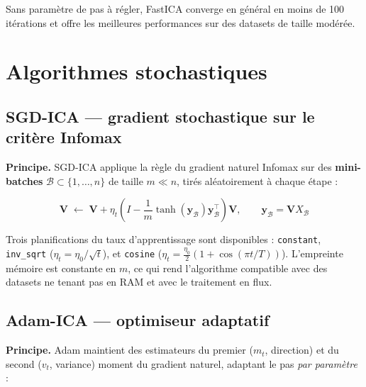 \documentclass[12pt, a4paper]{article}
\newcommand{\V}{\mathbf{V}}        %
\newcommand{\y}{\mathbf{y}}        %
\begin{document}
Sans paramètre de pas à régler, FastICA converge en général en moins de 100 itérations
et offre les meilleures performances sur des datasets de taille modérée.

\section{Algorithmes stochastiques}

\subsection{SGD-ICA — gradient stochastique sur le critère Infomax}

\textbf{Principe.}
SGD-ICA applique la règle du gradient naturel Infomax sur des \textbf{mini-batches}
$\mathcal{B} \subset \{1,\ldots,n\}$ de taille $m \ll n$, tirés aléatoirement à chaque étape :

\begin{formulabox}
\[
  \V \;\leftarrow\; \V + \eta_t \left( I - \frac{1}{m}\tanh(\y_\mathcal{B})\y_\mathcal{B}^\top
  \right) \V, \qquad \y_\mathcal{B} = \V X_\mathcal{B}
\]
\end{formulabox}

Trois planifications du taux d'apprentissage sont disponibles :
\texttt{constant}, \texttt{inv\_sqrt} ($\eta_t = \eta_0/\sqrt{t}$),
et \texttt{cosine} ($\eta_t = \frac{\eta_0}{2}(1+\cos(\pi t/T))$).
L'empreinte mémoire est constante en $m$, ce qui rend l'algorithme compatible avec
des datasets ne tenant pas en RAM et avec le traitement en flux.

\subsection{Adam-ICA — optimiseur adaptatif}

\textbf{Principe.}
Adam \cite{kingma2015} maintient des estimateurs du premier ($m_t$, direction) et du second
($v_t$, variance) moment du gradient naturel, adaptant le pas \emph{par paramètre} :
\end{document}
